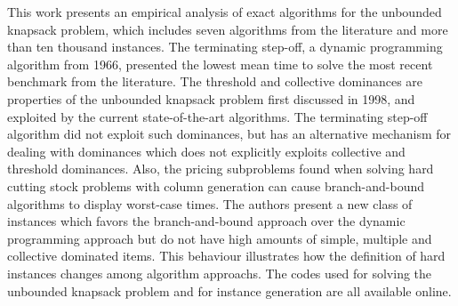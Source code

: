 This work presents an empirical analysis of exact algorithms for the unbounded knapsack problem, which includes seven algorithms from the literature and more than ten thousand instances.
The terminating step-off, a dynamic programming algorithm from 1966, presented the lowest mean time to solve the most recent benchmark from the literature.
The threshold and collective dominances are properties of the unbounded knapsack problem first discussed in 1998, and exploited by the current state-of-the-art algorithms. 
The terminating step-off algorithm did not exploit such dominances, but has an alternative mechanism for dealing with dominances which does not explicitly exploits collective and threshold dominances.
Also, the pricing subproblems found when solving hard cutting stock problems with column generation can cause branch-and-bound algorithms to display worst-case times.
The authors present a new class of instances which favors the branch-and-bound approach over the dynamic programming approach but do not have high amounts of simple, multiple and collective dominated items.
This behaviour illustrates how the definition of hard instances changes among algorithm approachs.
The codes used for solving the unbounded knapsack problem and for instance generation are all available online.
